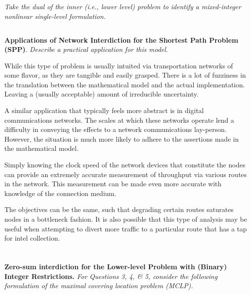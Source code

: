 \documentclass[12pt]{amsart}
\begin{document}
\subsubsection{}
\textit{Take the dual of the inner (i.e., lower level) problem to identify a mixed-integer
	nonlinear single-level formulation.}



\subsection{}
\textbf{Applications of Network Interdiction for the Shortest Path Problem (SPP)}.
\textit{Describe a practical application for this model.}

	While this type of problem is usually intuited via transportation networks of some flavor, 
	as they are tangible and easily grasped. There is a lot of fuzziness in the translation between
	the mathematical model and the actual implementation. Leaving a (usually acceptable) amount of 
	irreducible uncertainty.
	
	A similar application that typically feels more abstract is in digital communications networks.
	The scales at which these networks operate lend a difficulty in conveying the effects to a network
	communications lay-person. However, the situation is much more likely to adhere to the assertions made
	in the mathematical model.
	
	Simply knowing the clock speed of the network devices that constitute the nodes can provide an extremely
	accurate measurement of throughput via various routes in the network.
	This measurement can be made even more accurate with knowledge of the connection medium.
	
	The objectives can be the same, such that degrading certain routes saturates nodes in a bottleneck fashion.
	It is also possible that this type of analysis may be useful when attempting to divert more traffic to a particular
	route that has a tap for intel collection.


\section{}
\setcounter{subsection}{2}

\textbf{Zero-sum interdiction for the Lower-level Problem with (Binary) Integer Restrictions.} 
\textit{For Questions 3, 4, \& 5, consider the following formulation of the maximal covering 
location problem (MCLP).} \\
\end{document}
